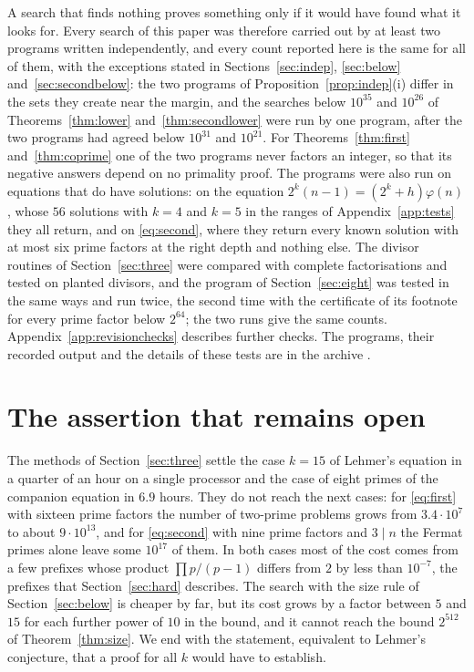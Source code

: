 \documentclass[11pt,reqno]{amsart}
\numberwithin{equation}{section}
\theoremstyle{plain}
\theoremstyle{definition}
\theoremstyle{remark}
\begin{document}
A search that finds nothing proves something only if it would have
found what it looks for. Every search of this paper was therefore
carried out by at least two programs written independently, and every
count reported here is the same for all of them, with the exceptions
stated in Sections~\ref{sec:indep}, \ref{sec:below}
and~\ref{sec:secondbelow}: the two programs of
Proposition~\ref{prop:indep}(i) differ in the sets they create near the
margin, and the searches below $10^{35}$ and $10^{26}$ of
Theorems~\ref{thm:lower} and~\ref{thm:secondlower} were run by one
program, after the two programs had agreed below $10^{31}$ and
$10^{21}$. For
Theorems~\ref{thm:first} and~\ref{thm:coprime} one of the two programs
never factors an integer, so that its negative answers depend on no
primality proof. The programs were also run on equations that do have
solutions: on the equation $2^k(n-1)=(2^k+h)\varphi(n)$, whose $56$
solutions with $k=4$ and $k=5$ in the ranges of
Appendix~\ref{app:tests} they all return, and on \eqref{eq:second},
where they return every known solution with at most six prime factors
at the right depth and nothing else. The divisor routines of
Section~\ref{sec:three} were compared with complete factorisations and
tested on planted divisors, and the program of Section~\ref{sec:eight}
was tested in the same ways and run twice, the second time with the
certificate of its footnote for every prime factor below $2^{64}$; the
two runs give the same counts. Appendix~\ref{app:revisionchecks}
describes further checks. The programs, their recorded output and the
details of these tests are in the archive \cite{Data}.

\section{The assertion that remains open}\label{sec:open}

The methods of Section~\ref{sec:three} settle the case $k=15$ of
Lehmer's equation in a quarter of an hour on a single processor and
the case of eight primes of the companion equation in $6.9$ hours.
They do not reach the next cases: for \eqref{eq:first} with sixteen
prime factors the number of two-prime problems grows from
$3.4\cdot10^7$ to about $9\cdot10^{13}$, and for \eqref{eq:second}
with nine prime factors and $3\mid n$ the Fermat primes alone leave
some $10^{17}$ of them. In both cases most of the cost comes from a
few prefixes whose product $\prod p/(p-1)$ differs from $2$ by less
than $10^{-7}$, the prefixes that Section~\ref{sec:hard} describes.
The search with the size rule of Section~\ref{sec:below} is cheaper
by far, but its cost grows by a factor between $5$ and $15$ for each
further power of $10$ in the bound, and it cannot reach the bound
$2^{512}$ of Theorem~\ref{thm:size}.
We end with the statement, equivalent to Lehmer's conjecture, that a
proof for all $k$ would have to establish.
\end{document}
